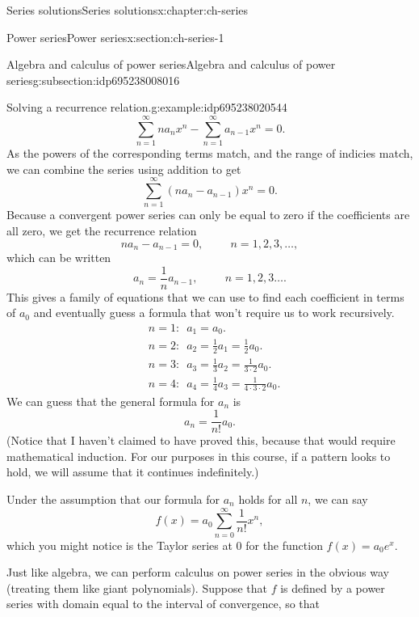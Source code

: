 \documentclass[oneside,10pt,]{book}
\numberwithin{equation}{section}
\numberwithin{equation}{section}
\newcommand{\amp}{&}
\begin{document}
\begin{chapterptx}{Series solutions}{}{Series solutions}{}{}{x:chapter:ch-series}
\begin{sectionptx}{Power series}{}{Power series}{}{}{x:section:ch-series-1}
\begin{subsectionptx}{Algebra and calculus of power series}{}{Algebra and calculus of power series}{}{}{g:subsection:idp695238008016}
\begin{example}{Solving a recurrence relation.}{g:example:idp695238020544}
\begin{equation*}
\sum_{n=1}^\infty n a_n x^n - \sum_{n=1}^\infty a_{n-1} x^{n} = 0.
\end{equation*}
As the powers of the corresponding terms match, and the range of indicies match, we can combine the series using addition to get%
\begin{equation*}
\sum_{n=1}^\infty (na_n - a_{n-1}) x^n = 0.
\end{equation*}
Because a convergent power series can only be equal to zero if the coefficients are all zero, we get the recurrence relation%
\begin{equation*}
na_n - a_{n-1}  = 0, \hspace{1cm} n = 1, 2, 3, \ldots,
\end{equation*}
which can be written%
\begin{equation*}
a_n = \frac{1}{n} a_{n-1}, \hspace{1cm} n = 1, 2, 3 \ldots.
\end{equation*}
This gives a family of equations that we can use to find each coefficient in terms of \(a_0\) and eventually guess a formula that won't require us to work recursively.%
%
\begin{align*}
\amp n = 1: \,\,\, a_1 = a_0.\\
\amp n = 2: \,\,\, a_2 = \frac{1}{2}a_1 = \frac{1}{2} a_0.\\
\amp n = 3: \,\,\, a_3 = \frac{1}{3}a_2 = \frac{1}{3\cdot 2} a_0.\\
\amp n = 4: \,\,\, a_4 = \frac{1}{4}a_3 = \frac{1}{4\cdot 3 \cdot 2} a_0.
\end{align*}
We can guess that the general formula for \(a_n\) is%
\begin{equation*}
a_n = \frac{1}{n!} a_0.
\end{equation*}
(Notice that I haven't claimed to have proved this, because that would require mathematical induction. For our purposes in this course, if a pattern looks to hold, we will assume that it continues indefinitely.)%
\par
Under the assumption that our formula for \(a_n\) holds for all \(n\), we can say%
\begin{equation*}
f(x) = a_0 \sum_{n=0}^\infty \frac{1}{n!} x^n,
\end{equation*}
which you might notice is the Taylor series at 0 for the function \(f(x) = a_0 e^x\).%
\end{example}
Just like algebra, we can perform calculus on power series in the obvious way (treating them like giant polynomials). Suppose that \(f\) is defined by a power series with domain equal to the interval of convergence, so that%

\end{subsectionptx}
\end{sectionptx}
\end{chapterptx}
\end{document}
